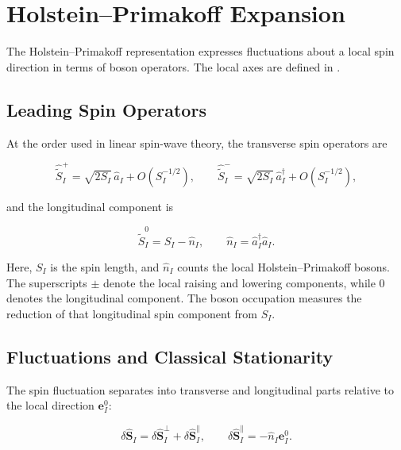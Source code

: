 
\hypertarget{sec-lswt-holstein-primakoff-expansion}{%
\section{Holstein--Primakoff Expansion}\label{sec-lswt-holstein-primakoff-expansion}}

The Holstein--Primakoff representation expresses fluctuations about a local spin direction in terms of boson operators. The local axes are defined in .

\subsection{Leading Spin Operators}

At the order used in linear spin-wave theory, the transverse spin operators are

\[
\hat{\widetilde S}_I^+
=\sqrt{2S_I}\,\hat a_I+O(S_I^{-1/2}),
\qquad
\hat{\widetilde S}_I^-
=\sqrt{2S_I}\,\hat a_I^\dagger+O(S_I^{-1/2}),
\]

and the longitudinal component is

\[
\hat{\widetilde S}_I^0=S_I-\hat n_I,
\qquad
\hat n_I=\hat a_I^\dagger\hat a_I.
\]

Here, \(S_I\) is the spin length, and \(\hat n_I\) counts the local Holstein--Primakoff bosons. The superscripts \(\pm\) denote the local raising and lowering components, while \(0\) denotes the longitudinal component. The boson occupation measures the reduction of that longitudinal spin component from \(S_I\).

\subsection{Fluctuations and Classical Stationarity}

The spin fluctuation separates into transverse and longitudinal parts relative to the local direction \(\mathbf e_I^0\):

\[
\delta\hat{\mathbf S}_I
=\delta\hat{\mathbf S}_I^\perp
 +\delta\hat{\mathbf S}_I^\parallel,
\qquad
\delta\hat{\mathbf S}_I^\parallel=-\hat n_I\mathbf e_I^0.
\]

